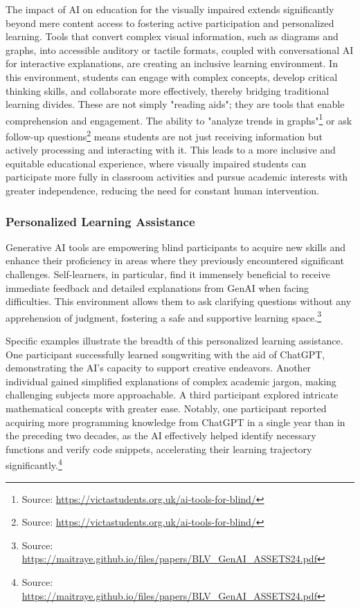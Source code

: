 The impact of AI on education for the visually impaired extends significantly beyond mere content access to fostering active participation and personalized learning. Tools that convert complex visual information, such as diagrams and graphs, into accessible auditory or tactile formats, coupled with conversational AI for interactive explanations, are creating an inclusive learning environment. In this environment, students can engage with complex concepts, develop critical thinking skills, and collaborate more effectively, thereby bridging traditional learning divides. These are not simply "reading aids"; they are tools that enable comprehension and engagement. The ability to "analyze trends in graphs"\footnote{Source: \url{https://victastudents.org.uk/ai-tools-for-blind/}} or ask follow-up questions\footnote{Source: \url{https://victastudents.org.uk/ai-tools-for-blind/}} means students are not just receiving information but actively processing and interacting with it. This leads to a more inclusive and equitable educational experience, where visually impaired students can participate more fully in classroom activities and pursue academic interests with greater independence, reducing the need for constant human intervention.

\subsubsection{Personalized Learning Assistance}

Generative AI tools are empowering blind participants to acquire new skills and enhance their proficiency in areas where they previously encountered significant challenges. Self-learners, in particular, find it immensely beneficial to receive immediate feedback and detailed explanations from GenAI when facing difficulties. This environment allows them to ask clarifying questions without any apprehension of judgment, fostering a safe and supportive learning space.\footnote{Source: \url{https://maitraye.github.io/files/papers/BLV_GenAI_ASSETS24.pdf}}

Specific examples illustrate the breadth of this personalized learning assistance. One participant successfully learned songwriting with the aid of ChatGPT, demonstrating the AI's capacity to support creative endeavors. Another individual gained simplified explanations of complex academic jargon, making challenging subjects more approachable. A third participant explored intricate mathematical concepts with greater ease. Notably, one participant reported acquiring more programming knowledge from ChatGPT in a single year than in the preceding two decades, as the AI effectively helped identify necessary functions and verify code snippets, accelerating their learning trajectory significantly.\footnote{Source: \url{https://maitraye.github.io/files/papers/BLV_GenAI_ASSETS24.pdf}}

